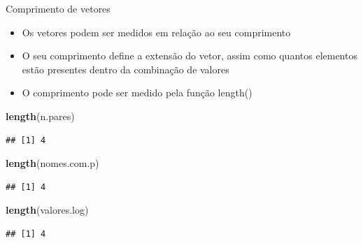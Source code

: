 \documentclass[
  10pt,
  ignorenonframetext,
]{beamer}
\newenvironment{Shaded}{\begin{snugshade}}{\end{snugshade}}
\newcommand{\KeywordTok}[1]{\textcolor[rgb]{0.13,0.29,0.53}{\textbf{#1}}}
\newcommand{\NormalTok}[1]{#1}
\providecommand{\tightlist}{%
  \setlength{\itemsep}{0pt}\setlength{\parskip}{0pt}}
\begin{document}
\begin{frame}[fragile]{Comprimento de vetores}
\protect\hypertarget{comprimento-de-vetores}{}
\begin{itemize}
\tightlist
\item
  Os vetores podem ser medidos em relação ao seu comprimento
\item
  O seu comprimento define a extensão do vetor, assim como quantos
  elementos estão presentes dentro da combinação de valores
\item
  O comprimento pode ser medido pela função length()
\end{itemize}

\begin{Shaded}
\begin{Highlighting}[]
\KeywordTok{length}\NormalTok{(n.pares)}
\end{Highlighting}
\end{Shaded}

\begin{verbatim}
## [1] 4
\end{verbatim}

\begin{Shaded}
\begin{Highlighting}[]
\KeywordTok{length}\NormalTok{(nomes.com.p)}
\end{Highlighting}
\end{Shaded}

\begin{verbatim}
## [1] 4
\end{verbatim}

\begin{Shaded}
\begin{Highlighting}[]
\KeywordTok{length}\NormalTok{(valores.log)}
\end{Highlighting}
\end{Shaded}

\begin{verbatim}
## [1] 4
\end{verbatim}
\end{frame}
\end{document}

